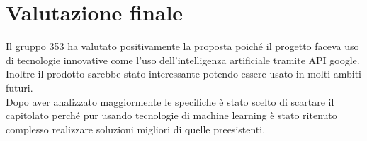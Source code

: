 \documentclass[StudioDiFattibilità.tex]{subfiles}
\begin{document}
\section{Valutazione finale}
Il gruppo 353 ha valutato positivamente la proposta poiché il progetto faceva uso di tecnologie innovative come l'uso dell'intelligenza artificiale tramite API google.
Inoltre il prodotto sarebbe stato interessante potendo essere usato in molti ambiti futuri.\\
Dopo aver analizzato maggiormente le specifiche è stato scelto di scartare il capitolato perché pur usando tecnologie di machine learning  è stato ritenuto complesso realizzare soluzioni migliori di quelle preesistenti.
\end{document}
